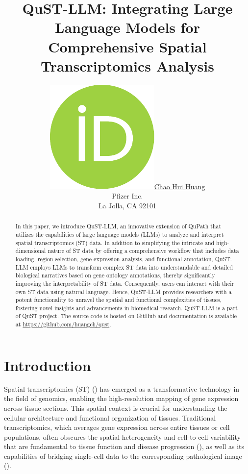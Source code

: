 \documentclass{article}
\title{QuST-LLM: Integrating Large Language Models for Comprehensive Spatial Transcriptomics Analysis}
\author{ \href{https://orcid.org/0000-0002-3837-8135}{\includegraphics[scale=0.06]{orcid.pdf}\hspace{1mm}Chao Hui Huang}\\
	Pfizer Inc.\\
	La Jolla, CA 92101 \\
}
\begin{document}
\maketitle

\begin{abstract}

In this paper, we introduce QuST-LLM, an innovative extension of QuPath that utilizes the capabilities of large language models (LLMs) to analyze and interpret spatial transcriptomics (ST) data. In addition to simplifying the intricate and high-dimensional nature of ST data by offering a comprehensive workflow that includes data loading, region selection, gene expression analysis, and functional annotation, QuST-LLM employs LLMs to transform complex ST data into understandable and detailed biological narratives based on gene ontology annotations, thereby significantly improving the interpretability of ST data. Consequently, users can interact with their own ST data using natural language. Hence, QuST-LLM provides researchers with a potent functionality to unravel the spatial and functional complexities of tissues, fostering novel insights and advancements in biomedical research.  QuST-LLM is a part of QuST project. The source code is hosted on GitHub and documentation is available at \url{https://github.com/huangch/qust}.

\end{abstract}


\section{Introduction}

Spatial transcriptomics (ST) (\cite{Stahl:2016}) has emerged as a transformative technology in the field of genomics, enabling the high-resolution mapping of gene expression across tissue sections. This spatial context is crucial for understanding the cellular architecture and functional organization of tissues. Traditional transcriptomics, which averages gene expression across entire tissues or cell populations, often obscures the spatial heterogeneity and cell-to-cell variability that are fundamental to tissue function and disease progression (\cite{Janesick:2023, NatureMethods:2021}), as well as its capabilities of bridging single-cell data to the corresponding pathological image (\cite{Bergenstrahle:2022,Huang:2023b}).
\end{document}
